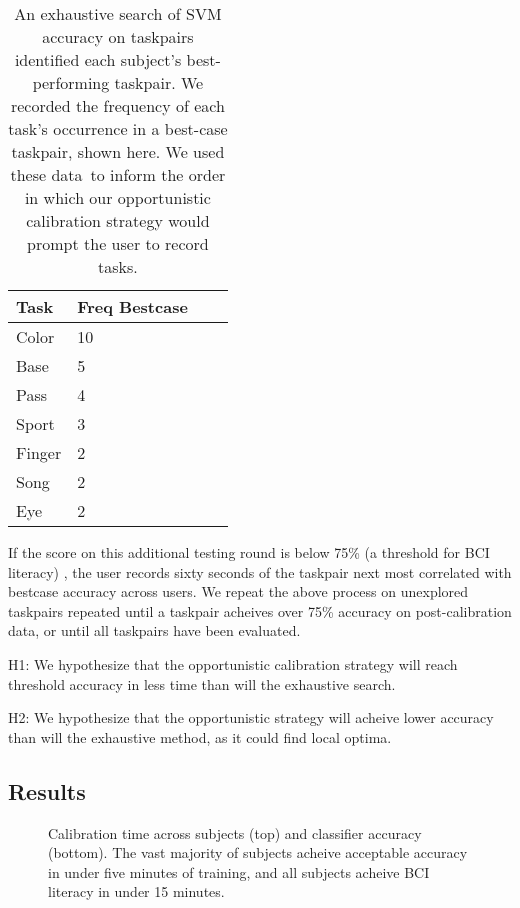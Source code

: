 \begin{table}[!h]
  \vspace{-0.2cm}
  \centering
  \begin{tabular}{ | l | l | l | p{5cm} |}
  \hline
  Task & Freq Bestcase \\ \hline
  Color & 10 \\ \hline
  Base & 5 \\ \hline
  Pass & 4 \\ \hline
  Sport & 3 \\ \hline
  Finger & 2 \\ \hline
  Song & 2 \\ \hline
  Eye & 2 \\ \hline
  \end{tabular}
  \caption{An exhaustive search of SVM accuracy on taskpairs identified each subject's best-performing taskpair. We recorded the frequency of each task's occurrence in a best-case taskpair, shown here. We used these data to inform the order in which our opportunistic calibration strategy would prompt the user to record tasks.}
  \label{table:name}
  \vspace{-0.1cm}
\end{table}

If the score on this additional testing round is below 75\% (a threshold for BCI literacy) \cite{vidaurre_towards_2010}, the user records sixty seconds of the taskpair next most correlated with bestcase accuracy across users. We repeat the above process on unexplored taskpairs repeated until a taskpair acheives over 75\% accuracy on post-calibration data, or until all taskpairs have been evaluated.

H1: We hypothesize that the opportunistic calibration strategy will reach threshold accuracy in less  time than will the exhaustive search.

H2: We hypothesize that the opportunistic strategy will acheive lower accuracy than will the exhaustive method, as it could find local optima.

\subsection{Results}

\begin{figure}[!h]
  \vspace{-0.2cm}
  \centering
   {}
  \caption{Calibration time across subjects (top) and classifier accuracy (bottom). The vast majority of subjects acheive acceptable accuracy in under five minutes of training, and all subjects acheive BCI literacy in under 15 minutes. }
  \label{fig:fig2}
  \vspace{-0.1cm}
\end{figure}

